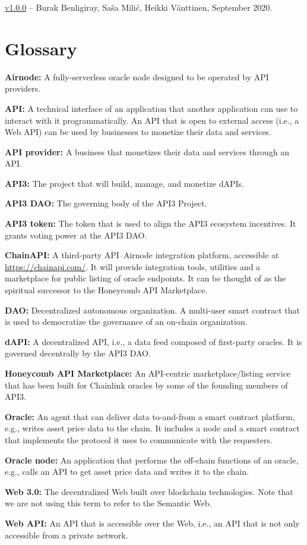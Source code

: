 \documentclass[11pt]{article}
\begin{document}
\href{https://github.com/api3dao/api3-whitepaper/releases/tag/v1.0.0}{v1.0.0} -- Burak Benligiray, Sa\v{s}a Mili\'{c}, Heikki Vänttinen, September 2020.

\section{Glossary}

\textbf{Airnode:} A fully-serverless oracle node designed to be operated by API providers.

\textbf{API:} A technical interface of an application that another application can use to interact with it programmatically.
An API that is open to external access (i.e., a Web API) can be used by businesses to monetize their data and services.

\textbf{API provider:} A business that monetizes their data and services through an API.

\textbf{API3:} The project that will build, manage, and monetize dAPIs.

\textbf{API3 DAO:} The governing body of the API3 Project.

\textbf{API3 token:} The token that is used to align the API3 ecosystem incentives.
It grants voting power at the API3 DAO.

\textbf{ChainAPI:} A third-party API--Airnode integration platform, accessible at \url{https://chainapi.com/}.
It will provide integration tools, utilities and a marketplace for public listing of oracle endpoints.
It can be thought of as the spiritual successor to the Honeycomb API Marketplace.

\textbf{DAO:} Decentralized autonomous organization.
A multi-user smart contract that is used to democratize the governance of an on-chain organization.

\textbf{dAPI:} A decentralized API, i.e., a data feed composed of first-party oracles.
It is governed decentrally by the API3 DAO.

\textbf{Honeycomb API Marketplace:} An API-centric marketplace/listing service that has been built for Chainlink oracles by some of the founding members of API3.

\textbf{Oracle:} An agent that can deliver data to-and-from a smart contract platform, e.g., writes asset price data to the chain.
It includes a node and a smart contract that implements the protocol it uses to communicate with the requesters.

\textbf{Oracle node:} An application that performs the off-chain functions of an oracle, e.g., calls an API to get asset price data and writes it to the chain.

\textbf{Web 3.0:} The decentralized Web built over blockchain technologies.
Note that we are not using this term to refer to the Semantic Web.

\textbf{Web API:} An API that is accessible over the Web, i.e., an API that is not only accessible from a private network.
\end{document}
